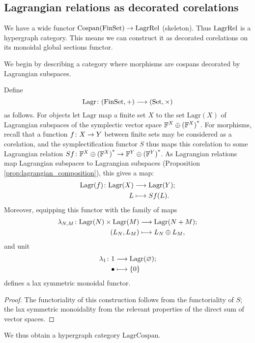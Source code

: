 \subsection{Lagrangian relations as decorated corelations}
We have a wide functor $\operatorname{{Cospan}}(\mathrm{FinSet}) \to \mathrm{LagrRel}$ (skeleton). Thus
$\mathrm{LagrRel}$ is a hypergraph category. This means we can construct it as decorated
corelations on its monoidal global sections functor.

We begin by describing a category where morphisms are cospans decorated by
Lagrangian subspaces.

\begin{proposition}
Define 
\[
  \mathrm{Lagr}{\colon} (\mathrm{FinSet},+) \longrightarrow (\mathrm{Set},\times)
\]
as follows. For objects let $\mathrm{Lagr}$ map a finite set $X$ to the set
$\mathrm{Lagr}(X)$ of Lagrangian subspaces of the symplectic vector space
${{\mathbb F}^{X} \oplus {({\mathbb F}^{X})}^\ast}$.  For morphisms, recall that a function $f{\colon} X \to Y$ between
finite sets may be considered as a corelation, and the symplectification functor
$S$ thus maps this corelation to some Lagrangian relation $Sf{\colon} {{\mathbb F}^{X} \oplus {({\mathbb F}^{X})}^\ast}
\to {{\mathbb F}^{Y} \oplus {({\mathbb F}^{Y})}^\ast}$. As Lagrangian relations map Lagrangian subspaces to Lagrangian
subspaces (Proposition \ref{prop:lagrangian_composition}), this gives a map: 
\begin{align*}
  \mathrm{Lagr}(f){\colon} \mathrm{Lagr}(X) &\longrightarrow \mathrm{Lagr}(Y); \\
  L &\longmapsto Sf(L).
\end{align*}
Moreover, equipping this functor with the family of maps
\begin{align*}
  \lambda_{N,M}{\colon} \mathrm{Lagr}(N) \times \mathrm{Lagr}(M) &\longrightarrow
  \mathrm{Lagr}(N+M);\\
  (L_N,L_M) &\longmapsto L_N \oplus L_M,
\end{align*}
and unit
\begin{align*}
  \lambda_1{\colon} 1 &\longrightarrow \mathrm{Lagr}(\varnothing);\\
  \bullet &\longmapsto \{0\}
\end{align*}
defines a lax symmetric monoidal functor.
\end{proposition}
\begin{proof}
  The functoriality of this construction follows from the functoriality of $S$;
  the lax symmetric monoidality from the relevant properties of the direct sum
  of vector spaces.
\end{proof}
We thus obtain a hypergraph category $\mathrm{LagrCospan}$.

